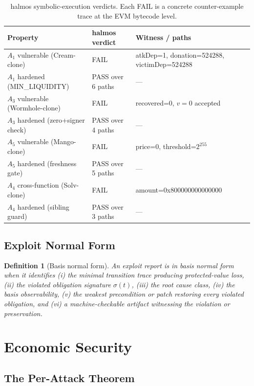 \documentclass[11pt,a4paper]{article}
\newtheorem{definition}[theorem]{Definition}
\begin{document}
\begin{table}[t]
\centering
\small
\begin{tabular}{lll}
\toprule
Property & halmos verdict & Witness / paths \\
\midrule
$A_1$ vulnerable (Cream-clone) & FAIL & atkDep=1, donation=524288, victimDep=524288 \\
$A_1$ hardened (MIN\_LIQUIDITY) & PASS over 6 paths & --- \\
$A_3$ vulnerable (Wormhole-clone) & FAIL & recovered=0, $v=0$ accepted \\
$A_3$ hardened (zero+signer check) & PASS over 4 paths & --- \\
$A_5$ vulnerable (Mango-clone) & FAIL & price=0, threshold=$2^{255}$ \\
$A_5$ hardened (freshness gate) & PASS over 5 paths & --- \\
$A_4$ cross-function (Solv-clone) & FAIL & amount=0x800000000000000 \\
$A_4$ hardened (sibling guard) & PASS over 3 paths & --- \\
\bottomrule
\end{tabular}
\caption{halmos symbolic-execution verdicts. Each FAIL is a concrete counter-example trace at the EVM bytecode level.}\label{tab:halmos}
\end{table}

\subsection{Exploit Normal Form}

\begin{definition}[Basis normal form]
An exploit report is in basis normal form when it identifies (i) the minimal transition trace producing protected-value loss, (ii) the violated obligation signature $\sigma(t)$, (iii) the root cause class, (iv) the basis observability, (v) the weakest precondition or patch restoring every violated obligation, and (vi) a machine-checkable artifact witnessing the violation or preservation.
\end{definition}

\section{Economic Security}\label{sec:economic}

\subsection{The Per-Attack Theorem}
\end{document}

